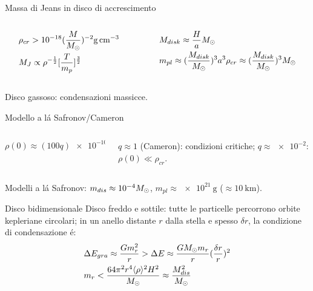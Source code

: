 \begin{frame}{Massa di Jeans in disco di accrescimento}
\begin{columns}[T]
\begin{column}{0.4\textwidth}
\begin{align*}
&\rho_{cr}>\num{e-18}(\frac{M}{\msun{}})\expy{-2}\si{\gram\per\cubic\cm}\\
&M_J\propto\rho\expy{-\frac{1}{2}}[\frac{T}{m_p}]\expy{\frac{3}{2}}
\end{align*}
\end{column}
\begin{column}{0.6\textwidth}
\begin{align*}
&M_{disk}\approx\frac{H}{a}M_{\odot}{}\\
&m_{pl}\approx (\frac{M_{disk}}{M_{\odot}{}})^3a^3\rho_{cr}\approx (\frac{M_{disk}}{M_{\odot}{}})^3M_{\odot}{}
\end{align*}
\end{column}
\end{columns}
Disco gassoso: condensazioni massicce.
\begin{block}{Modello a l\'a Safronov/Cameron}
\begin{columns}[T]
\begin{column}{0.5\textwidth}
\begin{equation*}
\rho(0)\approx(100q)\SI{e-10}{\gram\per\cubic\cm}
\end{equation*}
\end{column}
\begin{column}{0.5\textwidth}
$q\approx1$ (Cameron): condizioni critiche; $q\approx\num{e-2}$: $\rho(0)\ll\rho_{cr}$.
\end{column}
\end{columns}
Modelli a l\'a Safronov: $m_{dis}\approx\num{e-4}M_{\odot}{}$, $m_{pl}\approx\SI{e21}{\gram}$ ($\approx\SI{10}{\kilo\meter}$).
\end{block}
\begin{block}{Disco bidimensionale}
Disco freddo e sottile: tutte le particelle percorrono orbite kepleriane circolari; in un anello distante $r$ dalla stella e spesso $\delta r$, la condizione di condensazione \'e:
\begin{align*}
&\Delta E_{gra}\approx\frac{Gm_r^2}{r}>\Delta E\approx\frac{GM_{\odot}{}m_r}{r}(\frac{\delta r}{r})^2\\
&m_r<\frac{64\pi^2 r^4\langle \rho \rangle^2H^2}{M_{\odot}{}}\approx\frac{M_{dis}^2}{M_{\odot}{}}
\end{align*}
\end{block}
\end{frame}

